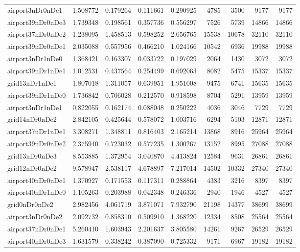 \begin{longtable}{|l|r|r|r|r|r|r|r|r|}
airport3nDr0nDe1 & 1.508772 & 0.179264 & 0.111661 & 0.290925 & 4785 & 3500 & 9177 & 9177 \\
airport39nDr0nDe3 & 1.739348 & 0.198561 & 0.357736 & 0.556297 & 7526 & 5739 & 14866 & 14866 \\
airport37nDr0nDe2 & 1.238095 & 1.458513 & 0.598252 & 2.056765 & 15538 & 10678 & 32110 & 32110 \\
airport39nDr0nDe1 & 2.035088 & 0.557956 & 0.466210 & 1.024166 & 10542 & 6936 & 19988 & 19988 \\
airport3nDr1nDe0 & 1.368421 & 0.163307 & 0.033722 & 0.197029 & 2064 & 1430 & 3072 & 3072 \\
airport39nDr1nDe1 & 1.012531 & 0.437564 & 0.254499 & 0.692063 & 8082 & 5475 & 15337 & 15337 \\
grid13nDr1nDe1 & 1.807018 & 1.311057 & 0.639951 & 1.951008 & 9475 & 6741 & 15635 & 15635 \\
airport39nDr1nDe0 & 1.736842 & 0.706028 & 0.212570 & 0.918598 & 8704 & 5291 & 13959 & 13959 \\
airport3nDr1nDe1 & 0.822055 & 0.162174 & 0.088048 & 0.250222 & 4036 & 3046 & 7729 & 7729 \\
grid14nDr0nDe2 & 2.842105 & 0.425644 & 0.578072 & 1.003716 & 6294 & 5103 & 12871 & 12871 \\
airport37nDr1nDe1 & 3.308271 & 1.348811 & 0.816403 & 2.165214 & 13868 & 8916 & 25964 & 25964 \\
airport39nDr0nDe2 & 2.375940 & 0.723032 & 0.577235 & 1.300267 & 13152 & 8995 & 27088 & 27088 \\
grid13nDr0nDe3 & 8.553885 & 1.372954 & 3.040870 & 4.413824 & 12584 & 9631 & 26861 & 26861 \\
grid12nDr0nDe2 & 9.578947 & 2.538117 & 4.678897 & 7.217014 & 14502 & 10332 & 27340 & 27340 \\
airport40nDr0nDe1 & 1.370927 & 0.171553 & 0.117311 & 0.288864 & 4383 & 3216 & 8397 & 8397 \\
airport40nDr1nDe0 & 1.105263 & 0.203988 & 0.042348 & 0.246336 & 2940 & 1946 & 4527 & 4527 \\
grid0nDr0nDe2 & 2.982456 & 4.061719 & 3.871071 & 7.932790 & 21198 & 14377 & 38699 & 38699 \\
airport3nDr0nDe2 & 2.092732 & 0.858310 & 0.509910 & 1.368220 & 12334 & 8508 & 25564 & 25564 \\
airport37nDr0nDe1 & 5.260410 & 1.603943 & 2.201637 & 3.805580 & 14261 & 9267 & 26529 & 26529 \\
airport40nDr0nDe3 & 1.631579 & 0.338242 & 0.387090 & 0.725332 & 9171 & 6967 & 19182 & 19182 \\

\end{longtable}

